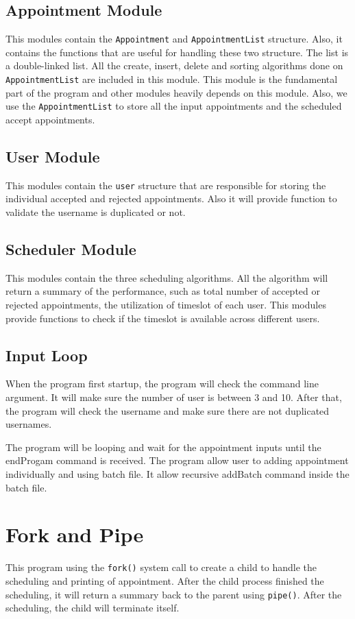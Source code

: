 \documentclass[12pt,a4paper]{report}
\begin{document}
\subsection{Appointment Module}
This modules contain the \texttt{Appointment} and \texttt{AppointmentList} structure. Also, it contains the functions that are useful for handling these two structure. The list is a double-linked list. All the create, insert, delete and sorting algorithms done on \texttt{AppointmentList} are included in this module. This module is the fundamental part of the program and other modules heavily depends on this module. Also, we use the \texttt{AppointmentList} to store all the input appointments and the scheduled accept appointments.
\subsection{User Module}
This modules contain the \texttt{user} structure that are responsible for storing the individual accepted and rejected appointments. Also it will provide function to validate the username is duplicated or not.
\subsection{Scheduler Module}
This modules contain the three scheduling algorithms. All the algorithm will return a summary of the performance, such as total number of accepted or rejected appointments, the utilization of timeslot of each user. This modules provide functions to check if the timeslot is available across different users.

\subsection{Input Loop}
When the program first startup, the program will check the command line argument. It will make sure the number of user is between 3 and 10. After that, the program will check the username and make sure there are not duplicated usernames.

The program will be looping and wait for the appointment inputs until the endProgam command is received. The program allow user to adding appointment individually and using batch file. It allow recursive addBatch command inside the batch file.

\section{Fork and Pipe}
This program using the \texttt{fork()} system call to create a child to handle the scheduling and printing of appointment. After the child process finished the scheduling, it will return a summary back to the parent using \texttt{pipe()}. After the scheduling, the child will terminate itself.
\end{document}
